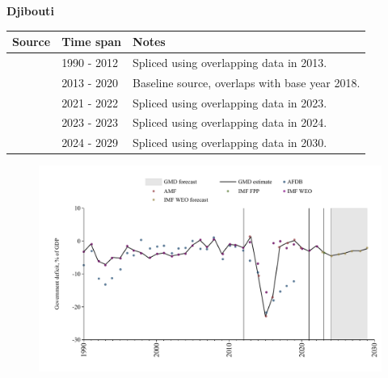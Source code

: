 \documentclass[12pt,a4paper,landscape]{article}
\begin{document}
\begin{adjustbox}{max totalsize={\paperwidth}{\paperheight},center}
\begin{minipage}[t][\textheight][t]{\textwidth}
\vspace*{0.5cm}
{}
\begin{center}
{\Large\bfseries Djibouti}
\end{center}
\vspace{0.5cm}
\begin{table}[H]
\centering
\small
\begin{tabular}{|l|l|l|}
\hline
\textbf{Source} & \textbf{Time span} & \textbf{Notes} \\
\hline
\rowcolor{white}\cite{IMF_WEO}& 1990 - 2012 &Spliced using overlapping data in 2013.\\
\rowcolor{lightgray}\cite{AMF}& 2013 - 2020 &Baseline source, overlaps with base year 2018.\\
\rowcolor{white}\cite{IMF_WEO}& 2021 - 2022 &Spliced using overlapping data in 2023.\\
\rowcolor{lightgray}\cite{IMF_FPP}& 2023 - 2023 &Spliced using overlapping data in 2024.\\
\rowcolor{white}\cite{IMF_WEO_forecast}& 2024 - 2029 &Spliced using overlapping data in 2030.\\
\hline
\end{tabular}
\end{table}
\begin{figure}[H]
\centering
\includegraphics[width=\textwidth,height=0.6\textheight,keepaspectratio]{graphs/DJI_govdef_GDP.pdf}
\end{figure}
\end{minipage}
\end{adjustbox}
\end{document}
